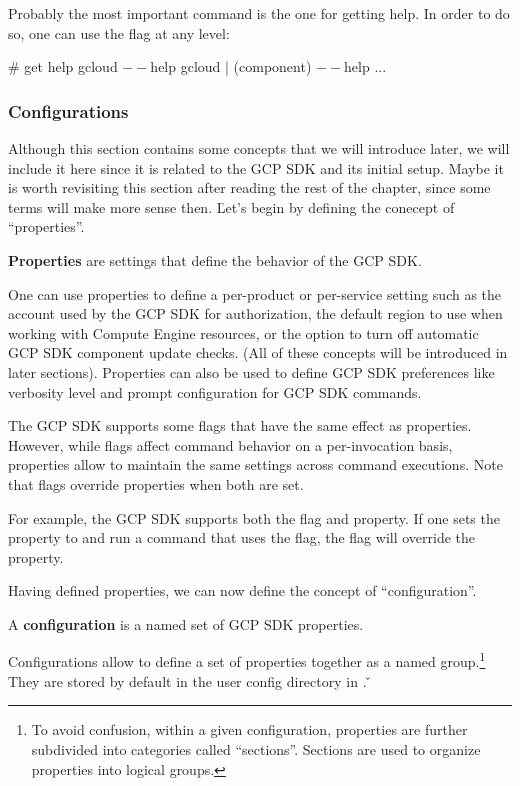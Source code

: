 Probably the most important command is the one for getting help. In order to do so, one can use the flag
 at any  level:
\begin{bash}
# get help
gcloud $--$help
gcloud | (component) $--$help
...
\end{bash}

\subsubsection{Configurations}

Although this section contains some concepts that we will introduce later, we will include it here since it is related
to the GCP SDK and its initial setup. Maybe it is worth revisiting this section after reading the rest of the chapter,
since some terms will make more sense then. \v

Let's begin by defining the conecept of ``properties''.

\bd[Properties]
\textbf{Properties} are settings that define the behavior of the GCP SDK\@.
\ed

\be
One can use properties to define a per-product or per-service setting such as the account used by the GCP SDK for
authorization, the default region to use when working with Compute Engine resources, or the option to turn off
automatic GCP SDK component update checks. (All of these concepts will be introduced in later sections). Properties
can also be used to define GCP SDK preferences like verbosity level and prompt configuration for GCP SDK commands.
\ee

The GCP SDK supports some flags that have the same effect as properties. However, while flags affect command behavior
on a per-invocation basis, properties allow to maintain the same settings across command executions. Note that flags
override properties when both are set.

\be
For example, the GCP SDK supports both the  flag and  property. If one sets the
 property to  and run a command that uses the  flag, the flag will
override the property.
\ee

Having defined properties, we can now define the concept of ``configuration''.

\bd[Configuration]
A \textbf{configuration} is a named set of GCP SDK properties.
\ed

Configurations allow to define a set of properties together as a named group.\footnote{To avoid confusion, within a
given configuration, properties are further subdivided into categories called ``sections''. Sections are used to
organize properties into logical groups.} They are stored by default in the user config directory in
. \v

